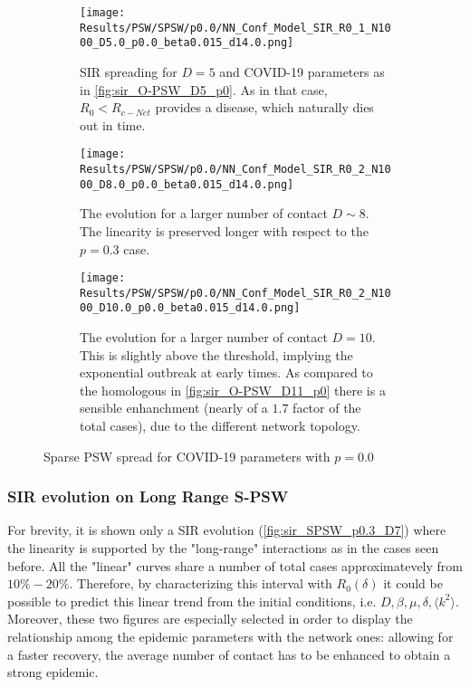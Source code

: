 \documentclass[a4paper,10pt,twoside]{book} %
\theoremstyle{definition}
\begin{document}
\begin{figure}[p]
	\centering
	\begin{subfigure}{\linewidth}
		\centering
		\texttt{[image: Results/PSW/SPSW/p0.0/NN\_Conf\_Model\_SIR\_R0\_1\_N1000\_D5.0\_p0.0\_beta0.015\_d14.0.png]}
		\caption{SIR spreading for $D = 5$ and COVID-19 parameters as in \autoref{fig:sir_O-PSW_D5_p0}. As in that case, $R_0 < R_{c-Net}$ provides a disease, which naturally dies out in time.}
		\label{fig:sir_S-PSW_D5_p0.0}
	\end{subfigure}
	\vfill	
	\begin{subfigure}{\linewidth}
		\centering
		\texttt{[image: Results/PSW/SPSW/p0.0/NN\_Conf\_Model\_SIR\_R0\_2\_N1000\_D8.0\_p0.0\_beta0.015\_d14.0.png]}
		\caption{The evolution for a larger number of contact $D \sim 8$. The linearity is preserved longer with respect to the $p = 0.3$ case.}
		\label{fig:sir_S-PSW_D8_p0.0}
	\end{subfigure}
	\vfill
	\begin{subfigure}{\linewidth}
		\centering
		\texttt{[image: Results/PSW/SPSW/p0.0/NN\_Conf\_Model\_SIR\_R0\_2\_N1000\_D10.0\_p0.0\_beta0.015\_d14.0.png]}
		\caption{The evolution for a larger number of contact $D = 10$. This is slightly above the threshold, implying the exponential outbreak at early times. As compared to the homologous in \autoref{fig:sir_O-PSW_D11_p0} there is a sensible enhanchment (nearly of a $1.7$ factor of the total cases), due to the different network topology.}
		\label{fig:sir_S-PSW_D10_p0.0}
	\end{subfigure}
	\caption{Sparse PSW spread for COVID-19 parameters with $p = 0.0$ }
	\label{fig:sir_SPSW_COVID}
\end{figure}

\newpage
\subsubsection*{SIR evolution on Long Range S-PSW}
For brevity, it is shown only a SIR evolution (\autoref{fig:sir_SPSW_p0.3_D7}) where the linearity is supported by the "long-range" interactions as in the cases seen before. All the "linear" curves share a number of total cases approximatevely from $10\% - 20\%$. Therefore, by characterizing this interval with $R_0(\delta)$ it could be possible to predict this linear trend from the initial conditions, i.e. $D, \beta, \mu, \delta, \langle k^2 \rangle$. Moreover, these two figures are especially selected in order to display the relationship among the epidemic parameters with the network ones: allowing for a faster recovery, the average number of contact has to be enhanced to obtain a strong epidemic.
\end{document}
